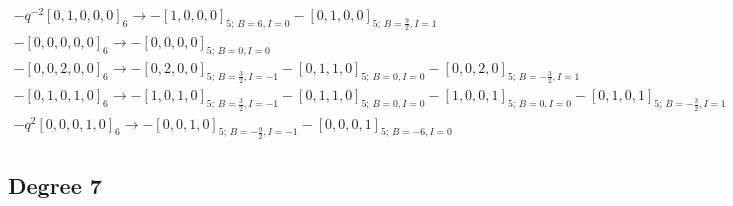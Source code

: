 \documentclass{article}
\begin{document}
\[\begin{gathered} -q^{-2}[0,1,0,0,0]_{6}\longrightarrow -[1,0,0,0]_{5;\,B=6,I=0} -[0,1,0,0]_{5;\,B=\frac{9}{2},I=1}\\-[0,0,0,0,0]_{6}\longrightarrow -[0,0,0,0]_{5;\,B=0,I=0}\\-[0,0,2,0,0]_{6}\longrightarrow -[0,2,0,0]_{5;\,B=\frac{3}{2},I=-1} -[0,1,1,0]_{5;\,B=0,I=0} -[0,0,2,0]_{5;\,B=-\frac{3}{2},I=1}\\-[0,1,0,1,0]_{6}\longrightarrow -[1,0,1,0]_{5;\,B=\frac{3}{2},I=-1} -[0,1,1,0]_{5;\,B=0,I=0} -[1,0,0,1]_{5;\,B=0,I=0} -[0,1,0,1]_{5;\,B=-\frac{3}{2},I=1}\\-q^{2}[0,0,0,1,0]_{6}\longrightarrow -[0,0,1,0]_{5;\,B=-\frac{9}{2},I=-1} -[0,0,0,1]_{5;\,B=-6,I=0}\end{gathered}\]\subsection*{Degree 7}
\end{document}
